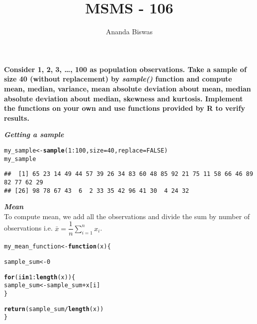 \documentclass[11pt, a4paper]{article}\usepackage[]{graphicx}\usepackage[]{xcolor}
\title{MSMS - 106}
\author{Ananda Biswas}
\date{}
\makeatletter
\newcommand{\hlnum}[1]{\textcolor[rgb]{0.686,0.059,0.569}{#1}}%
\newcommand{\hlopt}[1]{\textcolor[rgb]{0,0,0}{#1}}%
\newcommand{\hldef}[1]{\textcolor[rgb]{0.345,0.345,0.345}{#1}}%
\newcommand{\hlkwa}[1]{\textcolor[rgb]{0.161,0.373,0.58}{\textbf{#1}}}%
\newcommand{\hlkwb}[1]{\textcolor[rgb]{0.69,0.353,0.396}{#1}}%
\newcommand{\hlkwc}[1]{\textcolor[rgb]{0.333,0.667,0.333}{#1}}%
\newcommand{\hlkwd}[1]{\textcolor[rgb]{0.737,0.353,0.396}{\textbf{#1}}}%
\newenvironment{kframe}{%
 \def\at@end@of@kframe{}%
 \ifinner\ifhmode%
  \def\at@end@of@kframe{\end{minipage}}%
  \begin{minipage}{\columnwidth}%
 \fi\fi%
 \def\FrameCommand##1{\hskip\@totalleftmargin \hskip-\fboxsep
 \colorbox{shadecolor}{##1}\hskip-\fboxsep
     \hskip-\linewidth \hskip-\@totalleftmargin \hskip\columnwidth}%
 \MakeFramed {\advance\hsize-\width
   \@totalleftmargin\z@ \linewidth\hsize
   \@setminipage}}%
 {\par\unskip\endMakeFramed%
 \at@end@of@kframe}
\newenvironment{knitrout}{}{} %
\makeatother
\begin{document}
\maketitle

\smallpencil \hspace{0.25cm} \textbf{Consider 1, 2, 3, \ldots, 100 as population observations. Take a sample of size 40 (without replacement) by \textit{sample()} function and compute mean, median, variance, mean absolute deviation about mean, median absolute deviation about median, skewness and kurtosis. Implement the functions on your own and use functions provided by R to verify results.}

\vspace{0.5cm}

\faArrowAltCircleRight[regular] \textit{\textbf{Getting a sample}}

\begin{knitrout}\footnotesize
{}\color{fgcolor}\begin{kframe}
\begin{alltt}
\hldef{my_sample} \hlkwb{<-} \hlkwd{sample}\hldef{(}\hlnum{1}\hlopt{:}\hlnum{100}\hldef{,} \hlkwc{size} \hldef{=} \hlnum{40}\hldef{,} \hlkwc{replace} \hldef{=} \hlnum{FALSE}\hldef{)}
\hldef{my_sample}
\end{alltt}
\begin{verbatim}
##  [1] 65 23 14 49 44 57 39 26 34 83 60 48 85 92 21 75 11 58 66 46 89 82 77 62 29
## [26] 98 78 67 43  6  2 33 35 42 96 41 30  4 24 32
\end{verbatim}
\end{kframe}
\end{knitrout}

\faArrowAltCircleRight[regular] \textit{\textbf{Mean}} \\

To compute mean, we add all the observations and divide the sum by number of observations i.e. $\bar{x} = \dfrac{1}{n} \sum \limits_{i = 1}^{n} x_{i}$.

\begin{knitrout}\footnotesize
{}\color{fgcolor}\begin{kframe}
\begin{alltt}
\hldef{my_mean_function} \hlkwb{<-} \hlkwa{function}\hldef{(}\hlkwc{x}\hldef{)\{}

  \hldef{sample_sum} \hlkwb{<-} \hlnum{0}

  \hlkwa{for} \hldef{(i} \hlkwa{in} \hlnum{1}\hlopt{:}\hlkwd{length}\hldef{(x)) \{}
    \hldef{sample_sum} \hlkwb{<-} \hldef{sample_sum} \hlopt{+} \hldef{x[i]}
  \hldef{\}}

  \hlkwd{return}\hldef{(sample_sum} \hlopt{/} \hlkwd{length}\hldef{(x))}
\hldef{\}}
\end{alltt}
\end{kframe}
\end{knitrout}
\end{document}
